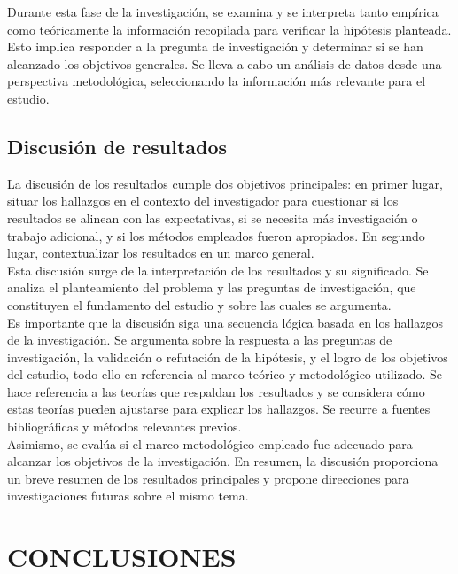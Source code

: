 \documentclass[12pt,a4paper,oneside]{report}
\begin{document}
Durante esta fase de la investigación, se examina y se interpreta tanto empírica como teóricamente la información recopilada para verificar la hipótesis planteada. Esto implica responder a la pregunta de investigación y determinar si se han alcanzado los objetivos generales. 
Se lleva a cabo un análisis de datos desde una perspectiva metodológica, seleccionando la información más relevante para el estudio.\\


\section{Discusión de resultados}

La discusión de los resultados cumple dos objetivos principales: en primer lugar, situar los hallazgos en el contexto del investigador para cuestionar si los resultados se alinean con las expectativas, si se necesita más investigación o trabajo adicional, y si los métodos empleados fueron apropiados. 
En segundo lugar, contextualizar los resultados en un marco general.\\

Esta discusión surge de la interpretación de los resultados y su significado. Se analiza el planteamiento del problema y las preguntas de investigación, que constituyen el fundamento del estudio y sobre las cuales se argumenta.\\

Es importante que la discusión siga una secuencia lógica basada en los hallazgos de la investigación. Se argumenta sobre la respuesta a las preguntas de investigación, la validación o refutación de la hipótesis, y el logro de los objetivos del estudio, todo ello en referencia al marco teórico y metodológico utilizado. 
Se hace referencia a las teorías que respaldan los resultados y se considera cómo estas teorías pueden ajustarse para explicar los hallazgos. Se recurre a fuentes bibliográficas y métodos relevantes previos.\\

Asimismo, se evalúa si el marco metodológico empleado fue adecuado para alcanzar los objetivos de la investigación. En resumen, la discusión proporciona un breve resumen de los resultados principales y propone direcciones para investigaciones futuras sobre el mismo tema.\\

\chapter{CONCLUSIONES}
\end{document}

